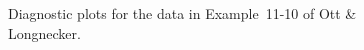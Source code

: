 \documentclass[a4paper, 12pt]{article}
\theoremstyle{plain}
\theoremstyle{definition}
\theoremstyle{remark}
\begin{document}
\begin{figure}
\begin{center}
\end{center}
\caption{Diagnostic plots for the data in Example~11-10 of Ott \& Longnecker.}
\label{fig:11-10_diagnostic}
\end{figure}
\end{document}
